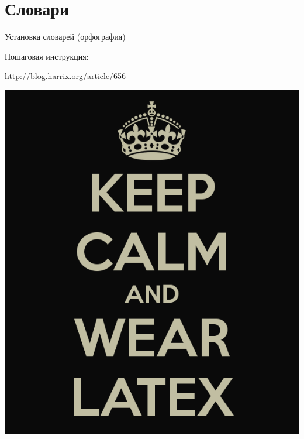 \documentclass[aspectratio=169]{beamer} %
\begin{document}
\section{Словари} 

 \begin{frame}[plain]{Установка словарей (орфография)}
 
 \begin{block}{Пошаговая инструкция:}
 	\vspace{3mm}
 	\centerline {\url{ http://blog.harrix.org/article/656}}
 	\vspace{3mm}
 \end{block}
\end{frame}

\begingroup
{}
\begin{frame}[plain]
\centering \includegraphics[width=0.55\linewidth]{wearlatex.png}
\end{frame}
\endgroup 
\end{document}
